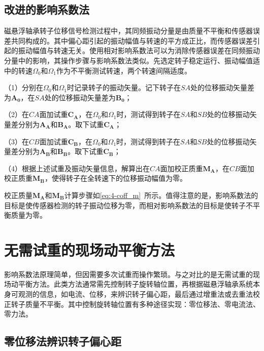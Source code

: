 \documentclass[
  lang=cn,
  degree=master,
  openany,oneside
]{nuaathesis}
\begin{document}
\subsection{改进的影响系数法}

磁悬浮轴承转子位移信号检测过程中，其同频振动分量是由质量不平衡和传感器误差共同构成的。其中偏心距引起的振动幅值与转速的平方成正比，而传感器误差引起的振动幅值与转速无关。使用相对影响系数法可以为消除传感器误差在同频振动分量中的影响，其操作步骤与影响系数法类似。先选定转子稳定运行、振动幅值适中的转速$\Omega _0$和$\Omega _1$作为不平衡测试转速，两个转速间隔适度。

（1）分别在$\Omega _0$和$\Omega _1$时记录转子的振动矢量。记下转子在$SA$处的位移振动矢量差为${\boldsymbol{A_0}}$，在$SA$处的位移振动矢量差为${\boldsymbol{B_0}}$；

（2）在$CA$面加试重${\boldsymbol{C_A}}$，在$\Omega _0$和$\Omega _1$时，测试得到转子在$SA$和$SB$处的位移振动矢量差分别为${\boldsymbol{A_A}}$和${\boldsymbol{B_A}}$。取下试重${\boldsymbol{C_A}}$；

（3）在$CB$面加试重${\boldsymbol{C_B}}$，在$\Omega _0$和$\Omega _1$时，测试得到转子在$SA$和$SB$处的位移振动矢量差分别为${\boldsymbol{A_B}}$和${\boldsymbol{B_B}}$。取下试重${\boldsymbol{C_B}}$；

（4）根据上述试重及振动矢量信息，解算出在$CA$面加校正质重${\boldsymbol{M_A}}$，在$CB$面加校正质重${\boldsymbol{M_B}}$，使得转子在全转速下的位移振动幅值为零。

校正质量${\boldsymbol{M_A}}$和${\boldsymbol{M_B}}$计算步骤如\autoref{eq:4-coff_m}~所示。值得注意的是，影响系数法的目标是使传感器检测的转子振动位移为零，而相对影响系数法的目标是使转子不平衡质量为零。

\section{无需试重的现场动平衡方法}

影响系数法原理简单，但因需要多次试重而操作繁琐。与之对比的是无需试重的现场动平衡方法。此类方法通常需先控制转子旋转轴位置，再根据磁悬浮轴承系统本身可观测的信息，如电流、位移，来辨识转子偏心距，最后通过增重法或去重法校正转子质量不平衡。其中控制旋转轴位置有多种途径实现：零位移法、零电流法、零力法。

\subsection{零位移法辨识转子偏心距}
\end{document}
